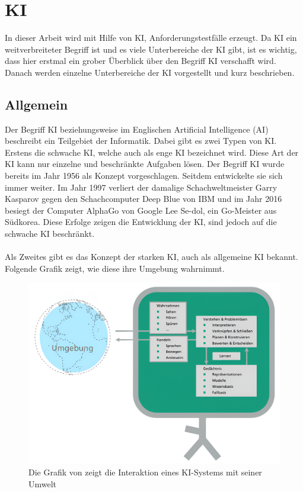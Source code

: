 \documentclass[12pt,toc=bib,toc=listof]{scrreprt}
\begin{document}
\section{KI} %
\label{sec:KI}
In dieser Arbeit wird mit Hilfe von KI, Anforderungstestfälle erzeugt. Da KI ein weitverbreiteter Begriff ist und es viele Unterbereiche der KI gibt, ist es wichtig, dass hier erstmal ein grober Überblick über den Begriff KI verschafft wird. Danach werden einzelne Unterbereiche der KI vorgestellt und kurz beschrieben.

\subsection{Allgemein} %
\label{sec:allgemein}
Der Begriff KI beziehungsweise im Englischen Artificial Intelligence (AI) beschreibt ein Teilgebiet der Informatik. Dabei gibt es zwei Typen von KI. Erstens die schwache KI, welche auch als enge KI bezeichnet wird. Diese Art der KI kann nur einzelne und beschränkte Aufgaben lösen. Der Begriff KI wurde bereits im Jahr 1956 als Konzept vorgeschlagen. Seitdem entwickelte sie sich immer weiter. Im Jahr 1997 verliert der damalige Schachweltmeister Garry Kasparov gegen den Schachcomputer Deep Blue von IBM und im Jahr 2016 besiegt der Computer AlphaGo von Google Lee Se-dol, ein Go-Meister aus Südkorea. Diese Erfolge zeigen die Entwicklung der KI, sind jedoch auf die schwache KI beschränkt.\\
\\
Als Zweites gibt es das Konzept der starken KI, auch als allgemeine KI bekannt. Folgende Grafik zeigt, wie diese ihre Umgebung wahrnimmt.
\begin{figure} [H]
    \centering
    \includegraphics[width=0.75\linewidth]{./Bilder/Fraunhofer_KI-Umgebung.png}
    \caption{Die Grafik von \textcite{Hecker2018} zeigt die Interaktion eines KI-Systems mit seiner Umwelt}
    \label{fig:enter-label}
\end{figure}
\end{document}
